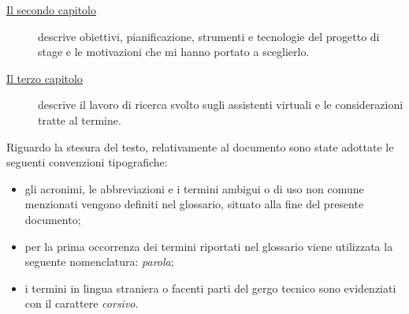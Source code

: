 \begin{description}
    \item[{\hyperref[cap:processi-metodologie]{Il secondo capitolo}}] descrive obiettivi, pianificazione, strumenti e tecnologie del progetto di stage e le motivazioni che mi hanno portato a sceglierlo.
    
    \item[{\hyperref[cap:descrizione-stage]{Il terzo capitolo}}] descrive il lavoro di ricerca svolto sugli assistenti virtuali e le considerazioni tratte al termine.
    
    
    
    
\end{description}

Riguardo la stesura del testo, relativamente al documento sono state adottate le seguenti convenzioni tipografiche:
\begin{itemize}
	\item gli acronimi, le abbreviazioni e i termini ambigui o di uso non comune menzionati vengono definiti nel glossario, situato alla fine del presente documento;
	\item per la prima occorrenza dei termini riportati nel glossario viene utilizzata la seguente nomenclatura: \emph{parola}\glsfirstoccur;
	\item i termini in lingua straniera o facenti parti del gergo tecnico sono evidenziati con il carattere \emph{corsivo}.
\end{itemize}